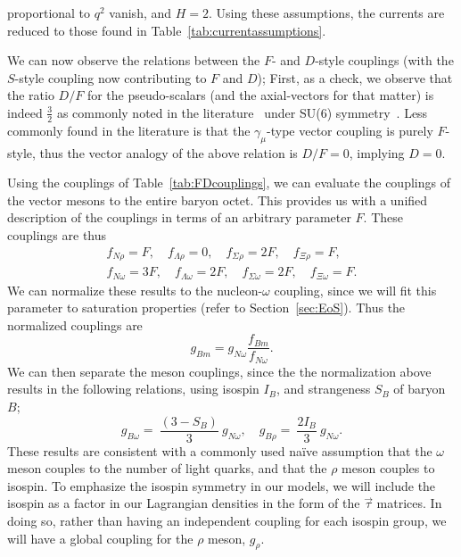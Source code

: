 \documentclass[11pt,a4paper,twoside]{carrollthesis}
\newcommand{\be}{\begin{equation}}
\newcommand{\ee}{\end{equation}}
\newcommand{\w}{\omega}
\begin{document}
proportional to $q^2$ vanish, and $H=2$. Using these assumptions, the
currents are reduced to those found in
Table~\ref{tab:currentassumptions}.\par
%
We can now observe the relations between the $F$- and $D$-style
couplings (with the $S$-style coupling now contributing to $F$ and
$D$); First, as a check, we observe that the ratio $D/F$ for the
pseudo-scalars (and the axial-vectors for that matter) is indeed
$\frac{3}{2}$ as commonly noted in the
literature~\cite{Gursey:1964,Aliev:2001} under SU(6)
symmetry~\cite{Ishida:1968}. Less commonly found in the literature is
that the $\gamma_\mu$-type vector coupling is purely $F$-style, thus
the vector analogy of the above relation is $D/F=0$, implying
$D=0$.\par
%
Using the couplings of Table~\ref{tab:FDcouplings}, we can evaluate
the couplings of the vector mesons to the entire baryon octet. This
provides us with a unified description of the couplings in terms of an
arbitrary parameter $F$. These couplings are thus
%
\be%
\begin{array}{c}
f_{N\rho} = F,\quad f_{\Lambda\rho} = 0,\quad f_{\Sigma\rho} =
2F,\quad f_{\Xi\rho} = F, \\[2mm] f_{N\w} = 3F,\quad f_{\Lambda\w} =
2F,\quad f_{\Sigma\w} = 2F,\quad f_{\Xi\w} = F.
\end{array}
\ee%
%
We can normalize these results to the nucleon-$\w$ coupling, since we
will fit this parameter to saturation properties (refer to
Section~\ref{sec:EoS}). Thus the normalized couplings are
%
\be g_{Bm} = g_{N\w}\frac{f_{Bm}}{f_{N\w}}. \ee
%
We can then separate the meson couplings, since the the normalization
above results in the following relations, using isospin $I_B$, and
strangeness $S_B$ of baryon $B$;
%
\be g_{B\w} =\ \frac{(3-S_B)}{3}\ g_{N\w}, \quad g_{B\rho}
=\ \frac{2I_B}{3}\ g_{N\w}.  \ee
%
These results are consistent with a commonly used na\"ive assumption
that the $\w$ meson couples to the number of light quarks, and that
the $\rho$ meson couples to isospin. To emphasize the isospin symmetry
in our models, we will include the isospin as a factor in our
Lagrangian densities in the form of the $\vec{\tau}$ matrices. In
doing so, rather than having an independent coupling for each isospin
group, we will have a global coupling for the $\rho$ meson,
$g_{\rho}$. \par
%
\end{document}
